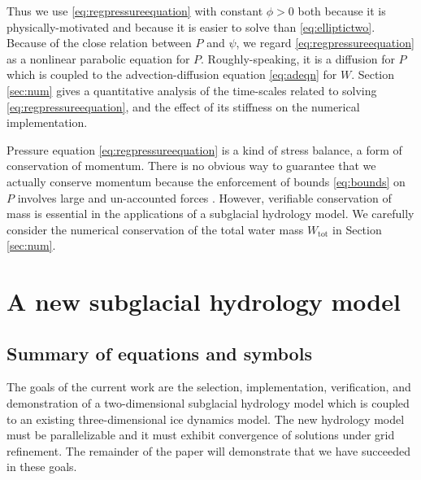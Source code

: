 \documentclass[11pt,final]{amsart}
\newcommand{\Wtot}{W_{\text{tot}}}
\begin{document}
Thus we use \eqref{eq:regpressureequation} with constant $\phi>0$ both because it is physically-motivated and because it is easier to solve than \eqref{eq:elliptictwo}.  Because of the close relation between $P$ and $\psi$, we regard \eqref{eq:regpressureequation} as a nonlinear parabolic equation for $P$.  Roughly-speaking, it is a diffusion for $P$ which is coupled to the advection-diffusion equation \eqref{eq:adeqn} for $W$.  Section \ref{sec:num} gives a quantitative analysis of the time-scales related to solving \eqref{eq:regpressureequation}, and the effect of its stiffness on the numerical implementation.

Pressure equation \eqref{eq:regpressureequation} is a kind of stress balance, a form of conservation of momentum.  There is no obvious way to guarantee that we actually conserve momentum because the enforcement of bounds \eqref{eq:bounds} on $P$ involves large and un-accounted forces \citep{Schoofetal2012}.  However, verifiable conservation of mass is essential in the applications of a subglacial hydrology model.  We carefully consider the numerical conservation of the total water mass $\Wtot$ in Section \ref{sec:num}.



\section{A new subglacial hydrology model} \label{sec:newmodel}

\subsection*{Summary of equations and symbols}  The goals of the current work are the selection, implementation, verification, and demonstration of a two-dimensional subglacial hydrology model which is coupled to an existing three-dimensional ice dynamics model.  The new hydrology model must be parallelizable and it must exhibit convergence of solutions under grid refinement.  The remainder of the paper will demonstrate that we have succeeded in these goals.
\end{document}
